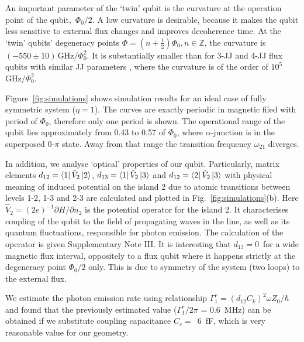 \documentclass[%
reprint,
superscriptaddress,
bibnotes,
amsmath,
amssymb,
aps,
showkeys,
prb,
]{revtex4-1}
\newcommand{\iket}[1]{\ensuremath{\Ket{#1}}}
\newcommand{\ibra}[1]{\ensuremath{\Bra{#1}}}
\newcommand{\iabs}[1]{\ensuremath{\left|#1\right|}}
\begin{document}
{An  important  parameter of the `twin' qubit is  the curvature at  the operation  point  of the  qubit, \,$\Phi_{0}/2$.  A  low curvature  is
desirable, because it  makes the  qubit less  sensitive to  external flux  changes and
improves  decoherence  time.   At   the  `twin'  qubits'  degeneracy  points
$      \Phi     =      (n+\frac{1}{2})\Phi_0,     n\in\mathbb{Z}      $,     the      curvature     is
$   (-550\pm10)\,\text{GHz}/\Phi_0^2  $.    It is substantially smaller than for 3-JJ and 4-JJ flux qubits with
similar JJ parameters \cite{Astafiev_2010, Stern_2014, Gustavsson_2012}, where the curvature is of the order of
$ 10^5$ $  \text{GHz}/\Phi_0^2$.

Figure~\ref{fig:simulations} shows simulation results for an ideal case of fully symmetric system ($\eta=1$). The curves are exactly periodic in magnetic filed with period of $\Phi_0$, therefore only one period is shown. The operational range of the qubit lies approximately from 0.43 to 0.57 of $\Phi_0$, where $\alpha$-junction is in the superposed 0-$\pi$ state\cite{Shulga_2018}. Away from that range the transition frequency $\omega_{21}$ diverges.


In addition, we analyse `optical' properties of our qubit.
Particularly, matrix elements $d_{12} = \ibra{1}\hat{V}_2\iket{2}$, $d_{13} = \ibra{1}\hat{V}_2\iket{3}$ and $d_{12} = \ibra{2}\hat{V}_2\iket{3}$ with physical meaning of induced potential on the island 2 due to atomic transitions between levels 1-2, 1-3 and 2-3 are calculated and plotted in Fig.~\ref{fig:simulations}(b). Here $\hat{V}_2 = (2e)^{-1}\partial H/\partial n_2$ is the potential operator for the island 2. It characterises coupling of the qubit to the field of propagating waves in the line, as well as its quantum fluctuations, responsible for photon emission. The calculation of the operator is given Supplementary Note III.
It is interesting that $d_{13} = 0$\, for a wide magnetic flux interval, oppositely to a flux qubit where it happens strictly at the degeneracy point $\Phi_0/2$ only. This is due to symmetry of the system (two loops) to the external flux.

We estimate the photon emission rate using relationship\cite{Astafiev_2010,Peng_2016} $\Gamma_1^r = (d_{12} C_k)^2 \omega Z_0/\hbar$ and found that the previously estimated value ($\Gamma_1^r/2\pi$ = 0.6~MHz) can be obtained if we substitute coupling capacitance $C_c =$~6~fF, which is very reasonable value for our geometry.

}
\end{document}
